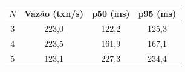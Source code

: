 \begin{tabular}{cccc}
\toprule
$N$ & Vazão (txn/s) & p50 (ms) & p95 (ms) \\
\midrule
3 & 223,0 & 122,2 & 125,3 \\
4 & 223,5 & 161,9 & 167,1 \\
5 & 123,1 & 227,3 & 234,4 \\
\bottomrule
\end{tabular}